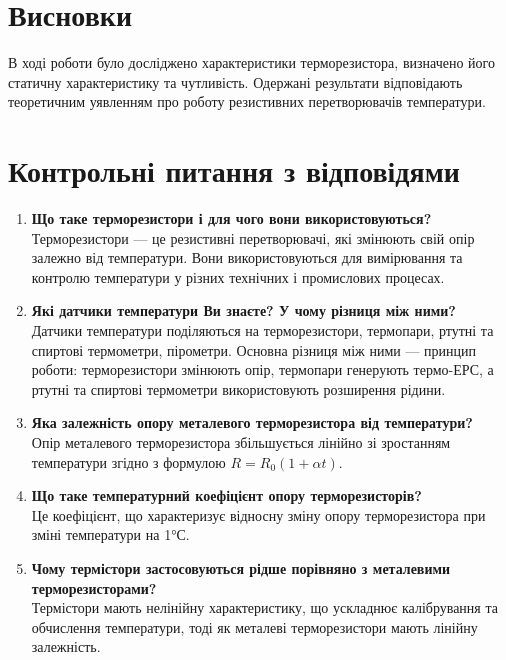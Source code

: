 \documentclass[a4paper]{article}
\begin{document}
\newpage
\section*{Висновки}
В ході роботи було досліджено характеристики терморезистора, визначено його статичну характеристику та чутливість. Одержані результати відповідають теоретичним уявленням про роботу резистивних перетворювачів температури.

\section*{Контрольні питання з відповідями}
\begin{enumerate}
    \item \textbf{Що таке терморезистори і для чого вони використовуються?}\\
    Терморезистори — це резистивні перетворювачі, які змінюють свій опір залежно від температури. Вони використовуються для вимірювання та контролю температури у різних технічних і промислових процесах.
    
    \item \textbf{Які датчики температури Ви знаєте? У чому різниця між ними?}\\
    Датчики температури поділяються на терморезистори, термопари, ртутні та спиртові термометри, пірометри. Основна різниця між ними — принцип роботи: терморезистори змінюють опір, термопари генерують термо-ЕРС, а ртутні та спиртові термометри використовують розширення рідини.
    
    \item \textbf{Яка залежність опору металевого терморезистора від температури?}\\
    Опір металевого терморезистора збільшується лінійно зі зростанням температури згідно з формулою $R = R_0 (1 + \alpha t)$.
    
    \item \textbf{Що таке температурний коефіцієнт опору терморезисторів?}\\
    Це коефіцієнт, що характеризує відносну зміну опору терморезистора при зміні температури на 1°С.
    
    \item \textbf{Чому термістори застосовуються рідше порівняно з металевими терморезисторами?}\\
    Термістори мають нелінійну характеристику, що ускладнює калібрування та обчислення температури, тоді як металеві терморезистори мають лінійну залежність.
    
\end{enumerate}
\end{document}
